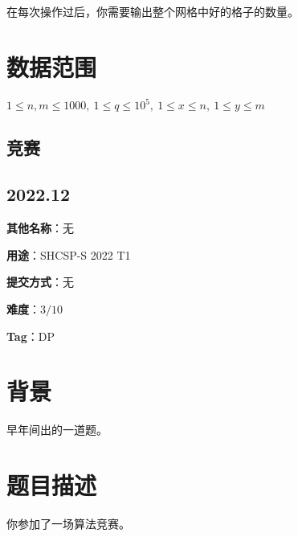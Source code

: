 \documentclass[a4paper,10pt]{article}
\begin{document}
在每次操作过后，你需要输出整个网格中好的格子的数量。

\section*{数据范围}

$1\leq n,m\leq 1000,\ 1\leq q\leq 10^5,\ 1\leq x\leq n,\ 1\leq y\leq m$

\newpage

\vspace*{\fill}
\begin{center}

\section{竞赛}

\subsection*{2022.12}

\vspace{10pt}

\textbf{其他名称}：无

\vspace{10pt}

\textbf{用途}：SHCSP-S 2022 T1

\vspace{10pt}

\textbf{提交方式}：无

\vspace{10pt}

\textbf{难度}：$3/10$

\vspace{10pt}

\textbf{Tag}：DP

\end{center}
\vspace*{\fill}

\newpage

\section*{背景}

早年间出的一道题。

\section*{题目描述}

你参加了一场算法竞赛。
\end{document}

